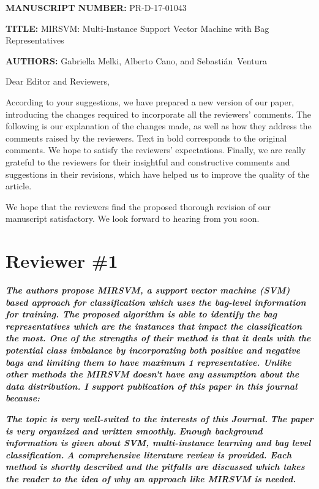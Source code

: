 \documentclass[a4paper,notitlepage]{article}
\begin{document}
\noindent \textbf{\small MANUSCRIPT NUMBER:} PR-D-17-01043 

\noindent \textbf{\small TITLE:} {\small MIRSVM: Multi-Instance Support Vector Machine with Bag Representatives}

\noindent \textbf{\small AUTHORS:} {\small Gabriella Melki, Alberto Cano, and Sebasti\'{a}n~Ventura}

\bigskip

\noindent Dear Editor and Reviewers,

\noindent According to your suggestions, we have prepared a new version of our paper, introducing the changes required to incorporate all the reviewers' comments.
The following is our explanation of the changes made, as well as how they address the comments raised by the reviewers. Text in bold corresponds to the original comments. We hope to satisfy the reviewers' expectations. Finally, we are really grateful to the reviewers for their insightful and constructive comments and suggestions in their revisions, which have helped us to improve the quality of the article.

\noindent We hope that the reviewers find the proposed thorough revision of our manuscript satisfactory. We look forward to hearing from you soon.

\section{Reviewer \#1}

\noindent \textbf{\textit{The authors propose MIRSVM, a support vector machine (SVM) based approach for classification which uses the bag-level information for training. The proposed algorithm is able to identify the bag representatives which are the instances that impact the classification the most. One of the strengths of their method is that it deals with the potential class imbalance by incorporating both positive and negative bags and limiting them to have maximum 1 representative. Unlike other methods the MIRSVM doesn't have any assumption about the data distribution. 
I support publication of this paper in this journal because: }}

\noindent \textbf{\textit{The topic is very well-suited to the interests of this Journal.}}
\noindent \textbf{\textit{The paper is very organized and written smoothly.}}
\noindent \textbf{\textit{Enough background information is given about SVM, multi-instance learning and bag level classification.}}
\noindent \textbf{\textit{A comprehensive literature review is provided. Each method is shortly described and the pitfalls are discussed which takes the reader to the idea of why an approach like MIRSVM is needed.}}
\end{document}
